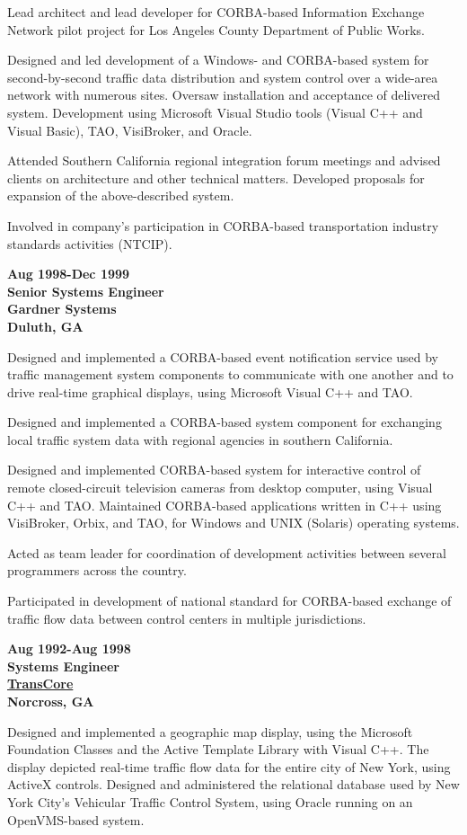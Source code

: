 Lead architect and lead developer for CORBA-based Information Exchange
Network pilot project for Los Angeles County Department of Public Works.

Designed and led development of a Windows- and CORBA-based system for
second-by-second traffic data distribution and system control over a
wide-area network with numerous sites. Oversaw installation and
acceptance of delivered system. Development using Microsoft Visual
Studio tools (Visual C++ and Visual Basic), TAO, VisiBroker, and Oracle.

Attended Southern California regional integration forum meetings and
advised clients on architecture and other technical matters. Developed
proposals for expansion of the above-described system.

Involved in company's participation in CORBA-based transportation
industry standards activities (NTCIP).

\textbf{Aug 1998-Dec 1999\\
Senior Systems Engineer\\
Gardner Systems\\
Duluth, GA}

Designed and implemented a CORBA-based event notification service used
by traffic management system components to communicate with one another
and to drive real-time graphical displays, using Microsoft Visual C++
and TAO.

Designed and implemented a CORBA-based system component for exchanging
local traffic system data with regional agencies in southern California.

Designed and implemented CORBA-based system for interactive control of
remote closed-circuit television cameras from desktop computer, using
Visual C++ and TAO. Maintained CORBA-based applications written in C++
using VisiBroker, Orbix, and TAO, for Windows and UNIX (Solaris)
operating systems.

Acted as team leader for coordination of development activities between
several programmers across the country.

Participated in development of national standard for CORBA-based
exchange of traffic flow data between control centers in multiple
jurisdictions.

\textbf{Aug 1992-Aug 1998\\
Systems Engineer\\
\href{https://transcore.com/its}{TransCore}\\
Norcross, GA}

Designed and implemented a geographic map display, using the Microsoft
Foundation Classes and the Active Template Library with Visual C++. The
display depicted real-time traffic flow data for the entire city of New
York, using ActiveX controls. Designed and administered the relational
database used by New York City's Vehicular Traffic Control System, using
Oracle running on an OpenVMS-based system.

